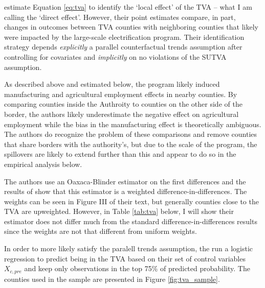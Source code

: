 \documentclass[11pt]{article}
\begin{document}
\citet{Kline_Moretti_2014} estimate Equation \ref{eq:tva} to identify the `local effect' of the TVA -- what I am calling the `direct effect'. However, their point estimates compare, in part, changes in outcomes between TVA counties with neighboring counties that likely were impacted by the large-scale electrification program. Their identification strategy depends \emph{explicitly} a parallel counterfactual trends assumption after controlling for covariates and \emph{implicitly} on no violations of the SUTVA assumption. 

As described above and estimated below, the program likely induced manufacturing and agricultural employment effects in nearby counties. By comparing counties inside the Authroity to counties on the other side of the border, the authors likely underestimate the negative effect on agricultural employment while the bias in the manufacturing effect is theoretically ambiguous. The authors do recognize the problem of these comparisons and remove counties that share borders with the authority's, but due to the scale of the program, the spillovers are likely to extend further than this and appear to do so in the empirical analysis below.  

The authors use an Oaxaca-Blinder estimator on the first differences and the results of \citet{Kline_2011} show that this estimator is a weighted difference-in-differences. The weights can be seen in Figure III of their text, but generally counties close to the TVA are upweighted. However, in Table \ref{tab:tva} below, I will show their estimator does not differ much from the standard difference-in-differences results since the weights are not that different from uniform weights. 

In order to more likely satisfy the paralell trends assumption, the run a logistic regression to predict being in the TVA based on their set of control variables $X_{c, pre}$ and keep only observations in the top 75\% of predicted probability. The counties used in the sample are presented in Figure \ref{fig:tva_sample}. 
\end{document}
